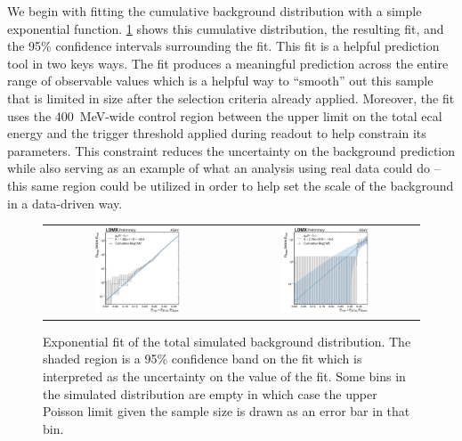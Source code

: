 We begin with fitting the cumulative background distribution with a simple exponential function.
\cref{fig:bkgd-fit} shows this cumulative distribution, the resulting fit, and the 95\% confidence
intervals surrounding the fit.
This fit is a helpful prediction tool in two keys ways.
The fit produces a meaningful prediction across the entire range of observable values
which is a helpful way to ``smooth'' out this sample that is limited in size after the selection
criteria already applied.
Moreover, the fit uses the \qty{400}{\MeV}-wide control region between the upper limit on the total
\ac{ecal} energy and the trigger threshold applied during readout to help constrain its parameters.
This constraint reduces the uncertainty on the background prediction while also serving
as an example of what an analysis using real data could do -- this same region could be utilized
in order to help set the scale of the background in a data-driven way.

\begin{figure}[htb]
  \centering
  \begin{tabular}{cc}
    \includegraphics[width=0.48\textwidth]{figures/ldmx/analysis/4gev-cumulative-bkgd-fit.pdf}
    &
    \includegraphics[width=0.48\textwidth]{figures/ldmx/analysis/8gev-cumulative-bkgd-fit.pdf}
  \end{tabular}
  \caption{%
    Exponential fit of the total simulated background distribution.
    The shaded region is a 95\% confidence band on the fit which is interpreted
    as the uncertainty on the value of the fit.
    Some bins in the simulated distribution are empty in which case the upper Poisson limit
    given the sample size is drawn as an error bar in that bin.
  }
  \label{fig:bkgd-fit}
\end{figure}

